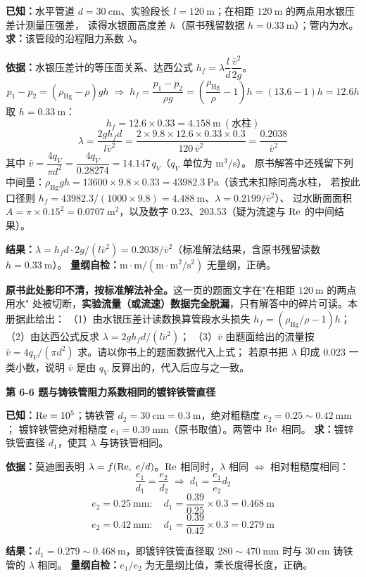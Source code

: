 \begin{jie}
\textbf{已知：}水平管道 $d=30\ \mathrm{cm}$、实验段长 $l=120\ \mathrm{m}$；在相距 $120\ \mathrm{m}$ 的两点用水银压差计测量压强差，
读得水银面高度差 $h$（原书残留数据 $h=0.33\ \mathrm{m}$）；管内为水。
\textbf{求：}该管段的沿程阻力系数 $\lambda$。

\textbf{依据：}水银压差计的等压面关系、达西公式 $h_f=\lambda\dfrac ld\dfrac{\bar v^2}{2g}$。
\[ p_1-p_2=(\rho_{\text{Hg}}-\rho)g h\;\Longrightarrow\;h_f=\frac{p_1-p_2}{\rho g}
=\left(\frac{\rho_{\text{Hg}}}{\rho}-1\right)h=(13.6-1)h=12.6h \]
取 $h=0.33\ \mathrm{m}$：
\[ h_f=12.6\times0.33=4.158\ \mathrm{m}\ (\text{水柱}) \]
\[ \lambda=\frac{2g h_f d}{l\bar v^2}=\frac{2\times9.8\times12.6\times0.33\times0.3}{120\,\bar v^2}
=\frac{0.2038}{\bar v^2} \]
其中 $\bar v=\dfrac{4q_V}{\pi d^2}=\dfrac{4q_V}{0.28274}=14.147\,q_V$（$q_V$ 单位为 $\mathrm{m^3/s}$）。
原书解答中还残留下列中间量：$\rho_{\text{Hg}}gh=13600\times9.8\times0.33=43982.3\ \mathrm{Pa}$（该式未扣除同高水柱，
若按此口径则 $h_f=43982.3/(1000\times9.8)=4.488\ \mathrm{m}$、$\lambda=0.2199/\bar v^2$）、
过水断面面积 $A=\pi\times0.15^2=0.0707\ \mathrm{m^2}$，以及数字 $0.23$、$203.53$（疑为流速与 $\mathrm{Re}$ 的中间结果）。

\textbf{结果：}$\lambda=h_f d\cdot2g/(l\bar v^2)=0.2038/\bar v^2$（标准解法结果，含原书残留读数 $h=0.33\ \mathrm{m}$）。
\textbf{量纲自检：}$\mathrm{m\cdot m/(m\cdot m^2/s^2)}$ 无量纲，正确。
\end{jie}

\begin{tishi}
\textbf{原书此处影印不清，按标准解法补全。}这一页的题面文字在"在相距 $120\ \mathrm{m}$ 的两点用水"
处被切断，\textbf{实验流量（或流速）数据完全脱漏}，只有解答中的碎片可读。本册据此给出：
（1）由水银压差计读数换算管段水头损失 $h_f=(\rho_{\text{Hg}}/\rho-1)h$；
（2）由达西公式反求 $\lambda=2gh_fd/(l\bar v^2)$；
（3）$\bar v$ 由题面给出的流量按 $\bar v=4q_V/(\pi d^2)$ 求。请以你书上的题面数据代入上式；
若原书把 $\lambda$ 印成 $0.023$ 一类小数，说明 $\bar v$ 是由 $q_V$ 反算出的，代入后应与之一致。
\end{tishi}

\noindent\textbf{第 6-6 题\quad 与铸铁管阻力系数相同的镀锌铁管直径}

\begin{jie}
\textbf{已知：}$\mathrm{Re}=10^5$；铸铁管 $d_2=30\ \mathrm{cm}=0.3\ \mathrm{m}$，绝对粗糙度 $e_2=0.25\sim0.42\ \mathrm{mm}$；
镀锌铁管绝对粗糙度 $e_1=0.39\ \mathrm{mm}$（原书取值）。两管中 $\mathrm{Re}$ 相同。
\textbf{求：}镀锌铁管直径 $d_1$，使其 $\lambda$ 与铸铁管相同。

\textbf{依据：}莫迪图表明 $\lambda=f(\mathrm{Re},\;e/d)$。$\mathrm{Re}$ 相同时，$\lambda$ 相同 $\iff$ 相对粗糙度相同：
\[ \frac{e_1}{d_1}=\frac{e_2}{d_2}\;\Longrightarrow\;d_1=\frac{e_1}{e_2}d_2 \]
\[ e_2=0.25\ \mathrm{mm}:\quad d_1=\frac{0.39}{0.25}\times0.3=0.468\ \mathrm{m} \]
\[ e_2=0.42\ \mathrm{mm}:\quad d_1=\frac{0.39}{0.42}\times0.3=0.279\ \mathrm{m} \]

\textbf{结果：}$d_1=0.279\sim0.468\ \mathrm{m}$，即镀锌铁管直径取 $280\sim470\ \mathrm{mm}$ 时与 $30\ \mathrm{cm}$ 铸铁管的 $\lambda$ 相同。
\textbf{量纲自检：}$e_1/e_2$ 为无量纲比值，乘长度得长度，正确。
\end{jie}

